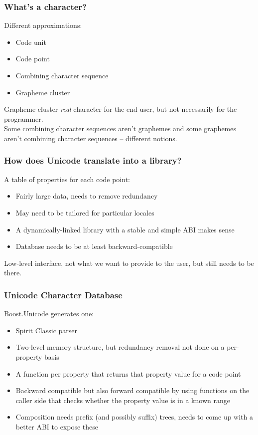 \documentclass{beamer}
\begin{document}
\begin{frame}
	\frametitle{What's a character?}
	
	Different approximations:
	\begin{itemize}
		\item Code unit
		\item Code point
		\item Combining character sequence
		\item Grapheme cluster
	\end{itemize}
	\bigskip
	
	Grapheme cluster \textit{real} character for the end-user, but not necessarily for the programmer.\\
	Some combining character sequences aren't graphemes and some graphemes aren't combining character sequences -- different notions.
	
\end{frame}

\begin{frame}
	\frametitle{How does Unicode translate into a library?}
	
	A table of properties for each code point:
	\begin{itemize}
		\item Fairly large data, needs to remove redundancy
		\item May need to be tailored for particular locales
		\item A dynamically-linked library with a stable and simple ABI makes sense
		\item Database needs to be at least backward-compatible
	\end{itemize}
	\bigskip
	
	Low-level interface, not what we want to provide to the user, but still needs to be there.
\end{frame}

\begin{frame}
	\frametitle{Unicode Character Database}
	
	Boost.Unicode generates one:
	\begin{itemize}
		\item Spirit Classic parser
		\item Two-level memory structure, but redundancy removal not done on a per-property basis
		\item A function per property that returns that property value for a code point
		\item Backward compatible but also forward compatible by using functions on the caller side that checks
		      whether the property value is in a known range
		\item Composition needs prefix (and possibly suffix) trees, needs to come up with a better ABI to expose these
	\end{itemize}
	
\end{frame}
\end{document}
